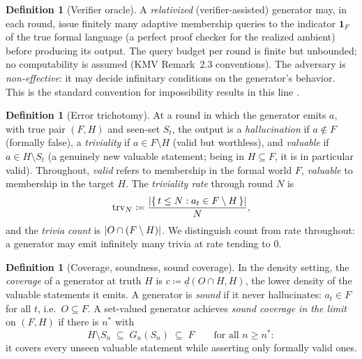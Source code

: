 \documentclass[11pt]{article}
\numberwithin{equation}{section}
\newcommand{\defeq}{\coloneqq}
\DeclarePairedDelimiter{\abs}{\lvert}{\rvert}
\newcommand{\Amb}{F}
\newcommand{\Val}{H}
\newcommand{\Seen}{S}
\newcommand{\Out}{O}
\newcommand{\dlow}[2]{\underline{d}(#1,#2)}
\newcommand{\trv}{\mathrm{trv}}
\newcommand{\cov}{c}
\theoremstyle{plain}
\theoremstyle{definition}
\newtheorem{definition}[theorem]{Definition}
\theoremstyle{remark}
\begin{document}
\begin{definition}[Verifier oracle]\label{def:verifier}
A \emph{relativized} (verifier-assisted) generator may, in each round, issue finitely many
adaptive membership queries to the indicator $\mathbf 1_{\Amb}$ of the true formal language (a
perfect proof checker for the realized ambient) before producing its output. The query budget
per round is finite but unbounded; no computability is assumed (KMV Remark~2.3 conventions).
The adversary is \emph{non-effective}: it may decide infinitary conditions on the generator's
behavior. This is the standard convention for impossibility results in this line
\citep{kalavasis2024characterizations}.
\end{definition}

\begin{definition}[Error trichotomy]\label{def:trichotomy}
At a round in which the generator emits $a$, with true pair $(\Amb, \Val)$ and seen-set
$\Seen_t$, the output is a \emph{hallucination} if $a \notin \Amb$ (formally false), a
\emph{triviality} if $a \in \Amb \setminus \Val$ (valid but worthless), and \emph{valuable} if
$a \in \Val \setminus \Seen_t$ (a genuinely new valuable statement; being in $\Val \subseteq
\Amb$, it is in particular valid). Throughout, \emph{valid} refers to membership in the formal
world $\Amb$, \emph{valuable} to membership in the target $\Val$. The \emph{triviality rate}
through round $N$ is
\begin{equation}\label{eq:trv}
  \trv_N \defeq \frac{\abs{\{\, t \le N : a_t \in \Amb \setminus \Val \,\}}}{N},
\end{equation}
and the \emph{trivia count} is $\abs{\Out \cap (\Amb \setminus \Val)}$. We distinguish count
from rate throughout: a generator may emit infinitely many trivia at rate tending to $0$.
\end{definition}

\begin{definition}[Coverage, soundness, sound coverage]\label{def:soundcov}
In the density setting, the \emph{coverage} of a generator at truth $\Val$ is $\cov \defeq
\dlow{\Out \cap \Val}{\Val}$, the lower density of the valuable statements it emits. A
generator is \emph{sound} if it never hallucinates: $a_t \in \Amb$ for all $t$, i.e.\ $\Out
\subseteq \Amb$. A set-valued generator achieves \emph{sound coverage in the limit} on $(\Amb,
\Val)$ if there is $n^*$ with
\begin{equation}\label{eq:soundcov}
  \Val \setminus \Seen_n \;\subseteq\; G_n(\Seen_n) \;\subseteq\; \Amb
  \qquad \text{for all } n \ge n^*:
\end{equation}
it covers every unseen valuable statement while asserting only formally valid ones.
\end{definition}
\end{document}

